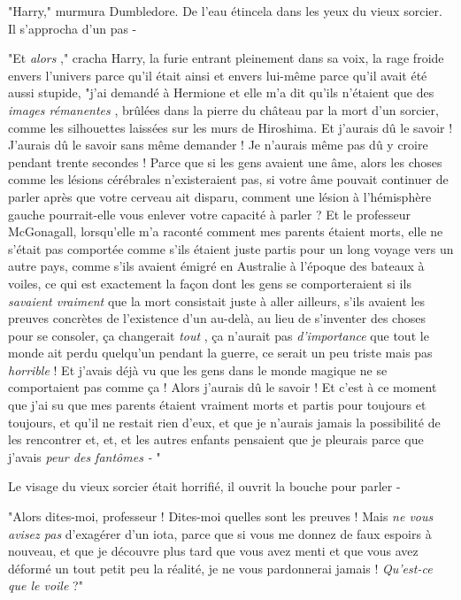 "Harry," murmura Dumbledore. De l'eau étincela dans les yeux du vieux sorcier. Il s'approcha d'un pas -

"Et \emph{alors} ," cracha Harry, la furie entrant pleinement dans sa voix, la rage froide envers l'univers parce qu'il était ainsi et envers lui-même parce qu'il avait été aussi stupide, "j'ai demandé à Hermione et elle m'a dit qu'ils n'étaient que des \emph{images rémanentes} , brûlées dans la pierre du château par la mort d'un sorcier, comme les silhouettes laissées sur les murs de Hiroshima. Et j'aurais dû le savoir ! J'aurais dû le savoir sans même demander ! Je n'aurais même pas dû y croire pendant trente secondes ! Parce que si les gens avaient une âme, alors les choses comme les lésions cérébrales n'existeraient pas, si votre âme pouvait continuer de parler après que votre cerveau ait disparu, comment une lésion à l'hémisphère gauche pourrait-elle vous enlever votre capacité à parler ? Et le professeur McGonagall, lorsqu'elle m'a raconté comment mes parents étaient morts, elle ne s'était pas comportée comme s'ils étaient juste partis pour un long voyage vers un autre pays, comme s'ils avaient émigré en Australie à l'époque des bateaux à voiles, ce qui est exactement la façon dont les gens se comporteraient si ils \emph{savaient vraiment}  que la mort consistait juste à aller ailleurs, s'ils avaient les preuves concrètes de l'existence d'un au-delà, au lieu de s'inventer des choses pour se consoler, ça changerait \emph{tout} , ça n'aurait pas \emph{d'importance}  que tout le monde ait perdu quelqu'un pendant la guerre, ce serait un peu triste mais pas \emph{horrible}  ! Et j'avais déjà vu que les gens dans le monde magique ne se comportaient pas comme ça ! Alors j'aurais dû le savoir ! Et c'est à ce moment que j'ai su que mes parents étaient vraiment morts et partis pour toujours et toujours, et qu'il ne restait rien d'eux, et que je n'aurais jamais la possibilité de les rencontrer et, et, et les autres enfants pensaient que je pleurais parce que j'avais \emph{peur des fantômes -} "

Le visage du vieux sorcier était horrifié, il ouvrit la bouche pour parler -

"Alors dites-moi, professeur ! Dites-moi quelles sont les preuves ! Mais \emph{ne vous avisez pas}  d'exagérer d'un iota, parce que si vous me donnez de faux espoirs à nouveau, et que je découvre plus tard que vous avez menti et que vous avez déformé un tout petit peu la réalité, je ne vous pardonnerai jamais ! \emph{Qu'est-ce que le voile}  ?"

